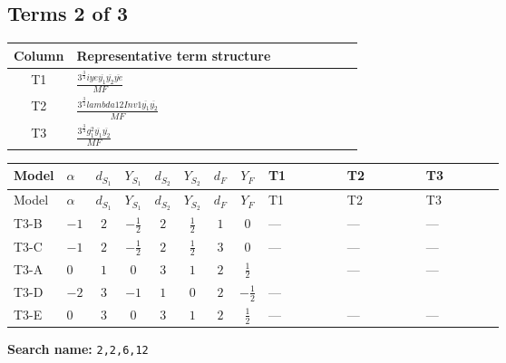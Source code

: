 \documentclass[8pt]{article}
\begin{document}
\begin{landscape}
\subsection*{Terms 2 of 3}
\begin{center}
\begin{tabular}{@{}c >{\raggedright\arraybackslash}p{0.82\linewidth}@{}}
\toprule
Column & Representative term structure \\
\midrule
T1 & \(\displaystyle \frac{3^{\frac{3}{4}} i ye \overline{y_{1}} \overline{y_{2}} \overline{ye}}{MF}\) \\
\midrule
T2 & \(\displaystyle \frac{3^{\frac{3}{4}} lambda12Inv1 \overline{y_{1}} \overline{y_{2}}}{MF}\) \\
\midrule
T3 & \(\displaystyle \frac{3^{\frac{3}{4}} g_{1}^{2} \overline{y_{1}} \overline{y_{2}}}{MF}\) \\
\midrule
\bottomrule
\end{tabular}
\end{center}
\smallskip
\tiny
\begin{longtable}{@{}llcccccc >{\raggedright\arraybackslash}p{0.21\linewidth} >{\raggedright\arraybackslash}p{0.21\linewidth} >{\raggedright\arraybackslash}p{0.21\linewidth}@{}}
\toprule
Model & $\alpha$ & $d_{S_1}$ & $Y_{S_1}$ & $d_{S_2}$ & $Y_{S_2}$ & $d_F$ & $Y_F$ & T1 & T2 & T3 \\
\midrule
\endfirsthead
\toprule
Model & $\alpha$ & $d_{S_1}$ & $Y_{S_1}$ & $d_{S_2}$ & $Y_{S_2}$ & $d_F$ & $Y_F$ & T1 & T2 & T3 \\
\midrule
\endhead
T3-B & $-1$ & $2$ & $-\frac{1}{2}$ & $2$ & $\frac{1}{2}$ & $1$ & $0$ & --- & --- & --- \\
\midrule
T3-C & $-1$ & $2$ & $-\frac{1}{2}$ & $2$ & $\frac{1}{2}$ & $3$ & $0$ & --- & --- & --- \\
\midrule
T3-A & $0$ & $1$ & $0$ & $3$ & $1$ & $2$ & $\frac{1}{2}$ & \scriptsize\adjustbox{max width=\linewidth}{$\begin{gathered} \frac{3^{\frac{3}{4}} i ye \overline{y_{1}} \overline{y_{2}} \overline{ye}}{12 MF}\end{gathered}$} & --- & --- \\
\midrule
T3-D & $-2$ & $3$ & $-1$ & $1$ & $0$ & $2$ & $-\frac{1}{2}$ & --- & \scriptsize\adjustbox{max width=\linewidth}{$\begin{gathered} \frac{3^{\frac{3}{4}} lambda12Inv1 \overline{y_{1}} \overline{y_{2}}}{6 MF}\end{gathered}$} & \scriptsize\adjustbox{max width=\linewidth}{$\begin{gathered} \frac{3^{\frac{3}{4}} g_{1}^{2} \overline{y_{1}} \overline{y_{2}}}{8 MF}\end{gathered}$} \\
\midrule
T3-E & $0$ & $3$ & $0$ & $3$ & $1$ & $2$ & $\frac{1}{2}$ & --- & --- & --- \\
\midrule
\bottomrule
\end{longtable}
\clearpage
\noindent\textbf{Search name: }\texttt{2,2,6,12}\par\smallskip

\end{landscape}
\end{document}
